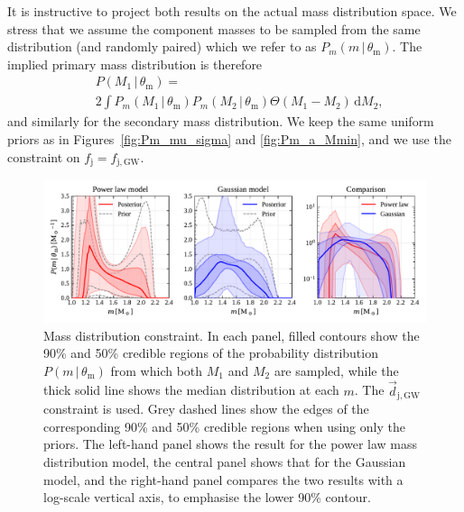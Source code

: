 \documentclass[]{aa}
\begin{document}
It is instructive to project both results on the actual mass distribution space. We stress that we assume the component masses to be sampled from the same distribution (and randomly paired) which we refer to as $P_m(m\,|\,\theta_\mathrm{m})$. The implied primary mass distribution is therefore
\begin{equation}
\begin{split}
& P(M_1\,|\,\theta_\mathrm{m})= \\
& 2\int P_m(M_1\,|\,\theta_\mathrm{m})P_m(M_2\,|\,\theta_\mathrm{m})\Theta(M_1-M_2)\,\mathrm{d}M_2, 
\end{split}
\end{equation}
and similarly for the secondary mass distribution.  We keep the same uniform priors as in Figures~\ref{fig:Pm_mu_sigma} and \ref{fig:Pm_a_Mmin},  and we use the constraint on $f_\mathrm{j}=f_\mathrm{j,GW}$.
%
\begin{figure}[t]
 \centering \includegraphics[width=\textwidth]{figures/dP_dm1_projected.pdf}
 \caption{Mass distribution constraint. In each panel, filled  contours show the 90\% and 50\% credible regions of the probability distribution $P(m\,|\,\theta_\mathrm{m})$ from which both $M_1$ and $M_2$ are sampled, while the thick solid line shows the median distribution at each $m$. The $\vec d_\mathrm{j,GW}$ constraint is used. Grey dashed lines show the edges of the corresponding 90\% and 50\% credible regions when using only the priors. The left-hand panel shows the result for the power law mass distribution model, the central panel shows that for the Gaussian model, and the right-hand panel compares the two results with a log-scale vertical axis, to emphasise the lower 90\% contour. }
 \label{fig:dP_dm1_projected}
\end{figure}
%
\end{document}
